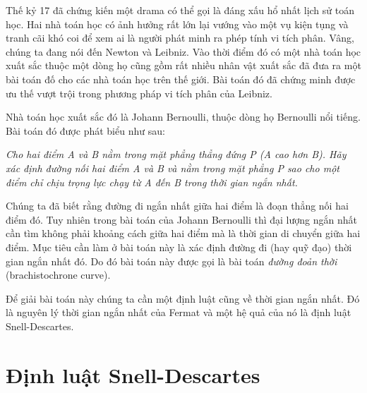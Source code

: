 \documentclass{mynotes}
\theoremstyle{definition}
\begin{document}
Thế kỷ 17 đã chứng kiến một drama có thể gọi là đáng xấu hổ nhất lịch sử toán học. Hai nhà toán học có ảnh hưởng rất lớn lại vướng vào một vụ kiện tụng và tranh cãi khó coi để xem ai là người phát minh ra phép tính vi tích phân. Vâng, chúng ta đang nói đến Newton và Leibniz. Vào thời điểm đó có một nhà toán học xuất sắc thuộc một dòng họ cũng gồm rất nhiều nhân vật xuất sắc đã đưa ra một bài toán đố cho các nhà toán học trên thế giới. Bài toán đó đã chứng minh được ưu thế vượt trội trong phương pháp vi tích phân của Leibniz.
    
Nhà toán học xuất sắc đó là Johann Bernoulli, thuộc dòng họ Bernoulli nổi tiếng. Bài toán đó được phát biểu như sau:
    
\textit{Cho hai điểm A và B nằm trong mặt phẳng thẳng đứng P (A cao hơn B). Hãy 
    xác định đường nối hai điểm A và B và nằm trong mặt phẳng P sao cho một 
    điểm chỉ chịu trọng lực chạy từ A đến B trong thời gian ngắn nhất.}

Chúng ta đã biết rằng đường đi ngắn nhất giữa hai điểm là đoạn thẳng nối hai điểm đó. Tuy nhiên trong bài toán của Johann Bernoulli thì đại lượng ngắn nhất cần tìm không phải khoảng cách giữa hai điểm mà là thời gian di chuyển giữa hai điểm. Mục tiêu cần làm ở bài toán này là xác định đường đi (hay quỹ đạo) thời gian ngắn nhất đó. Do đó bài toán này được gọi là bài toán \textit{đường đoản thời} (brachistochrone curve).

Để giải bài toán này chúng ta cần một định luật cũng về thời gian ngắn nhất. Đó là nguyên lý thời gian ngắn nhất của Fermat và một hệ quả của nó là định luật Snell-Descartes.

\section*{Định luật Snell-Descartes}
\end{document}
